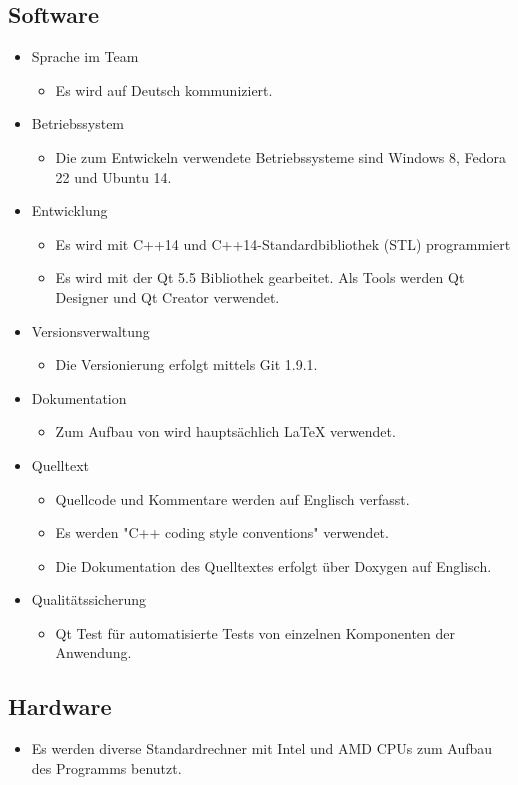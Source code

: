 \subsection{Software}
\begin{itemize}
\item Sprache im Team
	\begin{itemize}[label={--}]
		\item Es wird auf Deutsch kommuniziert.
	\end{itemize}
\item Betriebssystem
	\begin{itemize}[label={--}]
		\item Die zum Entwickeln verwendete Betriebssysteme sind Windows 8, Fedora 22 und Ubuntu 14.
	\end{itemize}
\item Entwicklung
	\begin{itemize}[label={--}]
		\item Es wird mit C++14 und C++14-Standardbibliothek (STL) programmiert
		\item Es wird mit der \gls{Qt} 5.5 Bibliothek gearbeitet. Als Tools werden \gls{Qt Designer} und \gls{Qt Creator} verwendet.
	\end{itemize}
\item \gls{Versionsverwaltung}
	\begin{itemize}[label={--}]
		\item Die Versionierung erfolgt mittels Git 1.9.1.
	\end{itemize}
\item Dokumentation
	\begin{itemize}[label={--}]
		\item Zum Aufbau von  wird hauptsächlich LaTeX verwendet.
	\end{itemize}
\item Quelltext
	\begin{itemize}[label={--}]
		\item Quellcode und Kommentare werden auf Englisch verfasst.
		\item Es werden "C++ coding style conventions" verwendet.
		\item Die Dokumentation des Quelltextes erfolgt über Doxygen auf Englisch.
	\end{itemize}
\item Qualitätssicherung
	\begin{itemize}[label={--}]
		\item \gls{Qt Test} für automatisierte Tests von einzelnen Komponenten der Anwendung.
	\end{itemize}

\end{itemize}

\subsection{Hardware}
\begin{itemize}
	\item Es werden diverse Standardrechner mit Intel und AMD CPUs zum Aufbau des Programms benutzt.
\end{itemize}
\pagebreak
